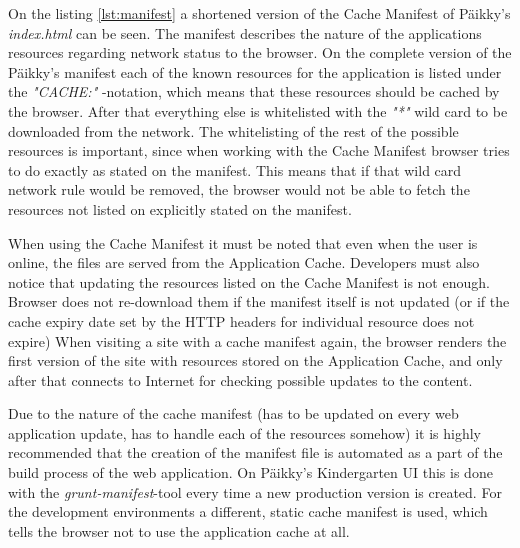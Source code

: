 On the listing \ref{lst:manifest} a shortened version of the Cache Manifest of Päikky's \textit{index.html} can be seen. The manifest describes the nature of the applications resources regarding network status to the browser. On the complete version of the Päikky's manifest each of the known resources for the application is listed under the \textit{"CACHE:"} -notation, which means that these resources should be cached by the browser. After that everything else is whitelisted with the \textit{"*"} wild card to be downloaded from the network. The whitelisting of the rest of the possible resources is important, since when working with the Cache Manifest browser tries to do exactly as stated on the manifest. This means that if that wild card network rule would be removed, the browser would not be able to fetch the resources not listed on explicitly stated on the manifest. \cite[Page 212]{lawson_introducing_2011}%


When using the Cache Manifest it must be noted that even when the user is online, the files are served from the Application Cache. Developers must also notice that updating the resources listed on the Cache Manifest is not enough. Browser does not re-download them if the manifest itself is not updated (or if the cache expiry date set by the HTTP headers for individual resource does not expire) When visiting a site with a cache manifest again, the browser renders the first version of the site with resources stored on the Application Cache, and only after that connects to Internet for checking possible updates to the content. \cite{archibald_application_2012}

Due to the nature of the cache manifest (has to be updated on every web application update, has to handle each of the resources somehow) it is highly recommended that the creation of the manifest file is automated as a part of the build process of the web application. On Päikky's Kindergarten UI this is done with the \textit{grunt-manifest}-tool every time a new production version is created. For the development environments a different, static cache manifest is used, which tells the browser not to use the application cache at all.

